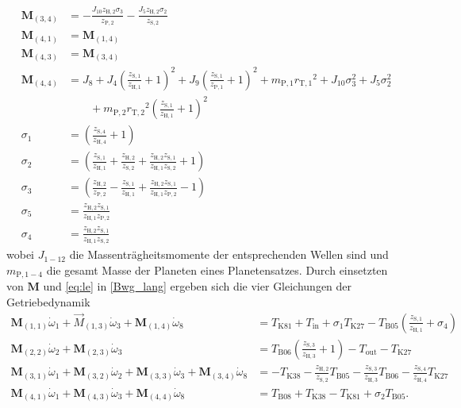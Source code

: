 \begin{align*}
	\pmb{M}_{(3,4)} &= -\frac{J_{10} z_\mathrm{H,2} \sigma_{3}}{z_\mathrm{P,2}} - \frac{J_{5} z_\mathrm{H,2} \sigma_{2}}{z_\mathrm{S,2}}\\
	\pmb{M}_{(4,1)} &= \pmb{M}_{(1,4)}\\
	\pmb{M}_{(4,3)} &= \pmb{M}_{(3,4)}\\
	\pmb{M}_{(4,4)} &= J_8+J_4 \left(\frac{z_\mathrm{S,1}}{z_\mathrm{H,1}}+1\right)^2+J_{9} \left(\frac{z_\mathrm{S,1}}{z_\mathrm{P,1}}+1\right)^2+m_\mathrm{P,1} {r_\mathrm{T,1}}^2+J_{10} \sigma_{3}^2+J_5 \sigma_{2}^2 \\
		&\qquad + m_\mathrm{P,2} {r_\mathrm{T,2}}^2 \left(\frac{z_\mathrm{S,1}}{z_\mathrm{H,1}}+1\right)^2\\
	\sigma_1 &= \left(\frac{z_{\mathrm{S,4}}}{z_{\mathrm{H,4}}}+1\right) \\
	\sigma_{2} &= \left(\frac{z_\mathrm{S,1}}{z_\mathrm{H,1}}+\frac{z_\mathrm{H,2}}{z_\mathrm{S,2}}+\frac{z_\mathrm{H,2} z_\mathrm{S,1}}{z_\mathrm{H,1} z_\mathrm{S,2}}+1\right)\\
	\sigma_{3} &= \left(\frac{z_\mathrm{H,2}}{z_\mathrm{P,2}}-\frac{z_\mathrm{S,1}}{z_\mathrm{H,1}}+\frac{z_\mathrm{H,2} z_\mathrm{S,1}}{z_\mathrm{H,1} z_\mathrm{P,2}}-1\right) \\
	\sigma_{5} &= \frac{z_\mathrm{H,2} z_\mathrm{S,1}}{z_\mathrm{H,1} z_\mathrm{P,2}} \\
	\sigma_{4} &= \frac{z_\mathrm{H,2} z_\mathrm{S,1}}{z_\mathrm{H,1} z_\mathrm{S,2}}
\end{align*}
wobei $J_{1-12}$ die Massenträgheitsmomente der entsprechenden Wellen sind und $m_{\mathrm{P},1-4}$ die gesamt Masse der Planeten eines Planetensatzes. Durch einsetzten von $\pmb{M}$ und \eqref{eq:le} in \eqref{Bwg_lang} ergeben sich die vier Gleichungen der Getriebedynamik
\begin{subequations} \label{eq:bewegungs_gleichungen}
	\begin{align}
		\pmb{M}_{(1,1)} \dot{\omega}_1 + \Vec{M}_{(1,3)} \dot{\omega}_3 +\pmb{M}_{(1,4)} \dot{\omega}_8
		&= T_{\mathrm{K81}} +T_{\mathrm{in}} + \sigma_1 T_{\mathrm{K27}}-T_{\mathrm{B05}} {\left(\frac{z_{\mathrm{S,1}} }{z_{\mathrm{H,1}}}+\sigma_{4} \right)}\\
		\pmb{M}_{(2,2)} \dot{\omega}_2 + \pmb{M}_{(2,3)} \dot{\omega}_3
		&= T_{\mathrm{B06}} {\left(\frac{z_{\mathrm{S,3}} }{z_{\mathrm{H,3}} }+1\right)}-T_{\mathrm{out}} -T_{\mathrm{K27}} \\
		\pmb{M}_{(3,1)} \dot{\omega}_1 + \pmb{M}_{(3,2)} \dot{\omega}_2 + \pmb{M}_{(3,3)} \dot{\omega}_3 + \pmb{M}_{(3,4)} \dot{\omega}_8
		&= -T_{\mathrm{K38}} -\frac{ z_{\mathrm{H,2}} }{z_{\mathrm{S,2}} }T_{\mathrm{B05}}-\frac{z_{\mathrm{S,3}}}{z_{\mathrm{H,3}}}T_{\mathrm{B06}}-\frac{z_{\mathrm{S,4}} }{z_{\mathrm{H,4}}}T_{\mathrm{K27}}\\
		\pmb{M}_{(4,1)} \dot{\omega}_1 + \pmb{M}_{(4,3)} \dot{\omega}_3 + \pmb{M}_{(4,4)} \dot{\omega}_8
		&= T_{\mathrm{B08}} +T_{\mathrm{K38}} -T_{\mathrm{K81}} +\sigma_{2} T_{\mathrm{B05}}.
	\end{align}
\end{subequations}

